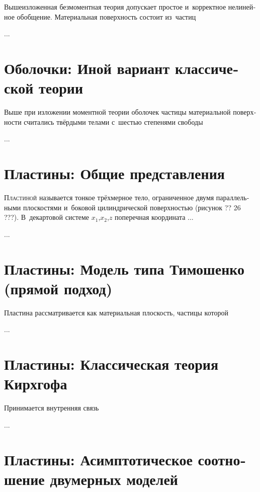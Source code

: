 \begin{otherlanguage}{russian}
Вышеизложенная безмоментная теория допускает простое и~корректное нелинейное обобщение. Материальная поверхность состоит из~частиц

...



\section{Оболочки: Иной вариант классической теории}


\noindent Выше при изложении моментной теории оболочек частицы материальной поверхности считались твёрдыми телами с~шестью степенями свободы

...




\section{Пластины: Общие представления}
\label{para:overviewofplates}

\lettrine[lines=2, findent=2pt, nindent=0pt]{П}{ластиной} называется тонкое трёхмерное тело, ограниченное двумя параллельными плоскостями и~боковой цилиндрической поверхностью (рисунок ?? 26 ???). В~декартовой системе $x_1$,\;$x_2$,\;$z$ поперечная координата ...

...



\section{Пластины: Модель типа Тимошенко (прямой подход)}

Пластина рассматривается как материальная плоскость, частицы которой

...



\section{Пластины: Классическая теория Кирхгофа}

Принимается внутренняя связь

...



\section{Пластины: Асимптотическое соотношение двумерных моделей}


\end{otherlanguage}
